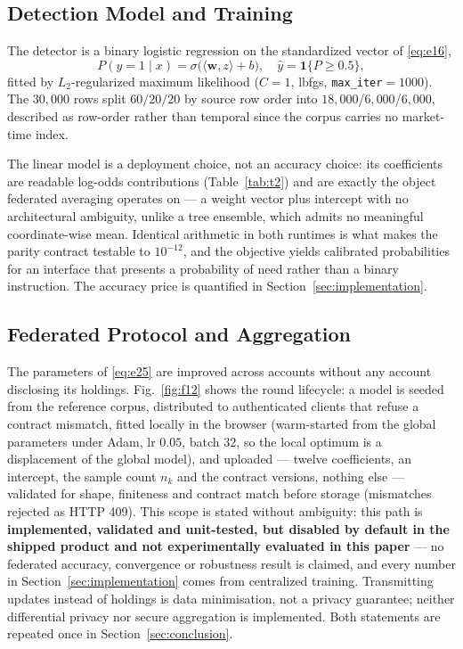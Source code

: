 \subsection{Detection Model and Training}

The detector is a binary logistic regression on the standardized vector of
\eqref{eq:e16},
\begin{equation}\label{eq:e25}
P(y=1\mid x) = \sigma\bigl(\langle \mathbf{w}, z \rangle + b\bigr), \quad
\hat{y} = \mathbf{1}\{P \geq 0.5\},
\end{equation}
fitted by $L_2$-regularized maximum likelihood ($C{=}1$, lbfgs,
\texttt{max\_iter}$=1000$). The $30{,}000$ rows split
$60/20/20$ by source row order into $18{,}000$/$6{,}000$/$6{,}000$, described as
row-order rather than temporal since the corpus carries no market-time index.

The linear model is a deployment choice, not an accuracy choice: its
coefficients are readable log-odds contributions (Table~\ref{tab:t2}) and are
exactly the object federated averaging operates on --- a weight vector plus
intercept with no architectural ambiguity, unlike a tree ensemble, which
admits no meaningful coordinate-wise mean. Identical arithmetic in both
runtimes is what makes the parity contract testable to $10^{-12}$, and the
objective yields calibrated probabilities for an interface that presents a
probability of need rather than a binary instruction. The accuracy price is
quantified in Section~\ref{sec:implementation}.

\subsection{Federated Protocol and Aggregation}

The parameters of \eqref{eq:e25} are improved across accounts without any
account disclosing its holdings. Fig.~\ref{fig:f12} shows the round lifecycle:
a model is seeded from the reference corpus, distributed to authenticated
clients that refuse a contract mismatch, fitted locally in the browser
(warm-started from the global parameters under Adam, lr $0.05$, batch $32$,
so the local optimum is a displacement of the global model), and uploaded ---
twelve coefficients, an intercept, the sample count $n_k$ and the contract
versions, nothing else --- validated for shape, finiteness and contract match
before storage (mismatches rejected as HTTP 409). This scope is stated
without ambiguity: this path is \textbf{implemented, validated and
unit-tested, but disabled by default in the shipped product and not
experimentally evaluated in this paper} --- no federated accuracy, convergence
or robustness result is claimed, and every number in
Section~\ref{sec:implementation} comes from centralized training. Transmitting
updates instead of holdings is data minimisation, not a privacy guarantee;
neither differential privacy nor secure aggregation is implemented. Both
statements are repeated once in Section~\ref{sec:conclusion}.


